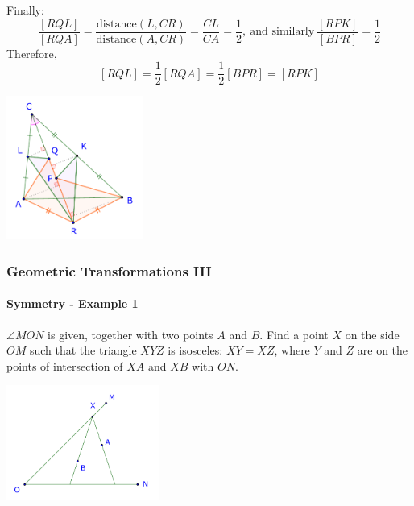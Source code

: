 \documentclass[8pt,xcolor=table,dvipsnames]{beamer}
\providecommand{\half}{\frac{1}{2}}
\begin{document}
\begin{frame}[t]
\begin{overprint}
\begin{center}
        \end{center}
        Finally:
        \[
            \frac{[RQL]}{[RQA]}=\frac{\text{distance}(L,CR)}{\text{distance}(A,CR)}=\frac{CL}{CA}=\frac{1}{2},\
            \text{and similarly}\ \frac{[RPK]}{[BPR]} = \frac{1}{2} 
        \]
        Therefore,
        \[
            [RQL]=\half [RQA]=\half [BPR]=[RPK]
        \]
        \begin{center}
            \includegraphics[width=4.5cm]{./svg/pdf/imo-2007-4-5.pdf}
        \end{center}
    \end{overprint}
\end{frame}

\begin{frame}[t]
    \frametitle{Geometric Transformations III}
    \framesubtitle{Symmetry - Example 1}
    \begin{example}
        $\angle MON$ is given, together with two points $A$ and $B$.
        Find a point $X$ on the side $OM$ such that the triangle $XYZ$ is isosceles: $XY = XZ$, 
        where $Y$ and $Z$ are on the points of intersection of $XA$ and $XB$ with $ON.$ 
    \end{example}

    \begin{center}
        \includegraphics[width=5cm]{./svg/pdf/symmetry-1a.pdf}
    \end{center}
\end{frame}
\end{document}

